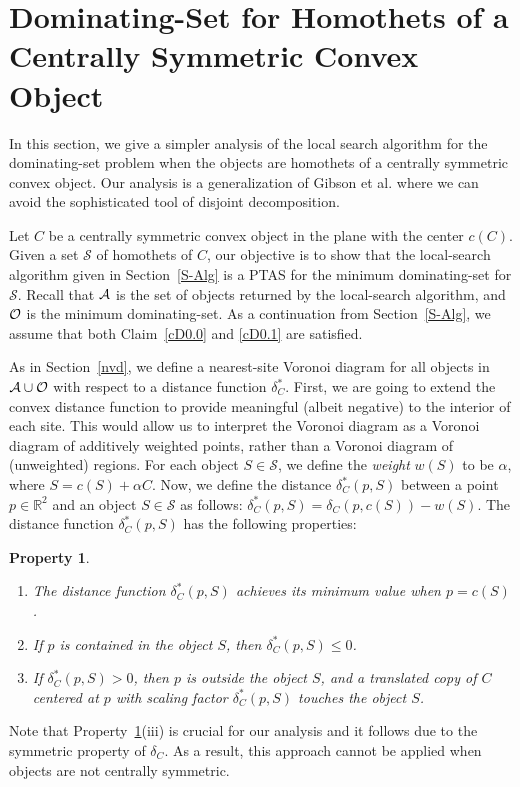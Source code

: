 \documentclass[a4paper,11pt]{article}
\newtheorem{property}{Property}
\begin{document}
\section{Dominating-Set for Homothets of a Centrally Symmetric Convex Object}\label{Appendix}
In this section, we give a simpler analysis of the local search algorithm for the dominating-set problem when 
the objects are homothets of a centrally symmetric  convex object.  Our analysis is a generalization of Gibson et al. \cite{GibsonP10} where we can avoid the sophisticated tool of disjoint decomposition. 

Let $C$ be a centrally symmetric convex object in the plane with the center $c(C)$.
Given a set  $\mathscr{S}$ of homothets  of  $C$, our objective is to show that  the local-search algorithm given in Section~\ref{S-Alg} is a PTAS for the minimum dominating-set for $\mathscr{S}$.  
  Recall  that ${\cal A}$  is  the set of objects returned by the  local-search algorithm, and  ${\cal O}$ is the minimum dominating-set. As a continuation from Section~\ref{S-Alg}, we assume that both Claim~\ref{cD0.0} and \ref{cD0.1} are satisfied.  

As in Section~\ref{nvd}, we define a nearest-site Voronoi diagram for all objects in ${\cal A}\cup {\cal O}$ with respect to a distance function $\delta_{C}^{*}$.
First, we are going to extend the convex distance function to provide meaningful (albeit negative) to the interior of each site. This would allow us to interpret the Voronoi diagram as a Voronoi diagram of additively weighted points, rather than a Voronoi diagram of (unweighted) regions. For each  object $S\in \mathscr{S}$, we define the \emph{weight} $w(S)$ to be $\alpha$, where $S=c(S)+\alpha C$.
  Now, we define the  distance $\delta_{C}^{*}(p,S)$ between a point $p \in \mathbb{R}^2$ and an object $S\in \mathscr{S}$ as follows: $\delta_{C}^{*}(p,S)=\delta_C(p,c({S}))-w(S)$. The  distance function $\delta_{C}^{*}(p,S)$ has the following properties:

\begin{property}
\label{p6}
\begin{enumerate}[label=(\roman*)]
\item The distance function $\delta_{C}^{*}(p,S)$ achieves its minimum value when $p=c(S)$.
\item If $p$ is contained in the object $S$, then
$\delta_{C}^{*}(p,S)\leq 0$.
\item If $\delta_{C}^{*}(p,S)>0$, then $p$ is outside the object $S$, 
and a translated copy of $C$ centered at $p$ with 
 scaling factor $\delta_{C}^{*}(p,S)$  touches the object $S$.
\end{enumerate}
\end{property}
Note that Property~\ref{p6}(iii) is crucial for our analysis and it follows due to the symmetric property of $\delta_C$. As a result, this approach cannot
be applied when objects are not centrally symmetric.
\end{document}
